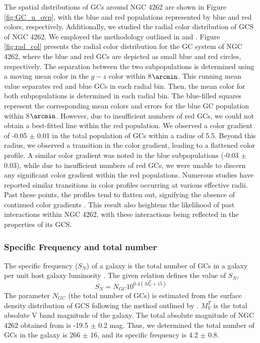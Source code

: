 \documentclass[fleqn,usenatbib]{mnras}
\begin{document}
The spatial distributions of GCs around NGC 4262 are shown in Figure \ref{fig:GC_u_ovp}, with the blue and red populations represented by blue and red colors, respectively. Additionally, we studied the radial color distribution of GCS of NGC 4262. We employed the methodology outlined in \citet{2011forbe} and \citet{sreeja2014}. Figure \ref{fig:rad_col} presents the radial color distribution for the GC system of NGC 4262, where the blue and red GCs are depicted as small blue and red circles, respectively. The separation between the two subpopulations is determined using a moving mean color in the $g - z$ color within 8$\arcmin$. This running mean value separates red and blue GCs in each radial bin. Then, the mean color for both subpopulations is determined in each radial bin. The blue-filled squares represent the corresponding mean colors and errors for the blue GC population within 8$\arcmin$. However, due to insufficient numbers of red GCs, we could not obtain a best-fitted line within the red population. We observed a color gradient of -0.05 $\pm$ 0.01 in the total population of GCs within a radius of 5.5\arcmin. Beyond this radius, we observed a transition in the color gradient, leading to a flattened color profile. A similar color gradient was noted in the blue subpopulations (-0.03 $\pm$ 0.03), while due to insufficient numbers of red GCs, we were unable to discern any significant color gradient within the red populations. Numerous studies have reported similar transitions in color profiles occurring at various effective radii. Past these points, the profiles tend to flatten out, signifying the absence of continued color gradients \citep{2011forbe,sreeja2014,2021Taylor,2024Caso}. This result also heightens the likelihood of past interactions within NGC 4262, with these interactions being reflected in the properties of its GCS.



\subsubsection{Specific Frequency and total number}
The specific frequency ($S_{N}$) of a galaxy is the total number of GCs in a galaxy per unit host galaxy luminosity \citep{1981Harrisandvanderbergh}.
The given relation defines the value of $S_{N}$,
\begin{equation}
S_{N} = N_{GC} 10^{0.4(M_{V}^{T}+15)}
\end{equation}
The parameter $N_{GC}$ (the total number of GCs) is estimated from the surface density distribution of GCS following the method outlined by \citet{sreeja2014}. $M_{V}^{T}$ is the total absolute V band magnitude of the galaxy. The total absolute magnitude of NGC 4262 obtained from \citet{2013Harris} is -19.5 $\pm$ 0.2 mag. Thus, we determined the total number of GCs in the galaxy is 266 $\pm$ 16, and its specific frequency is 4.2 $\pm$ 0.8. 
\end{document}
